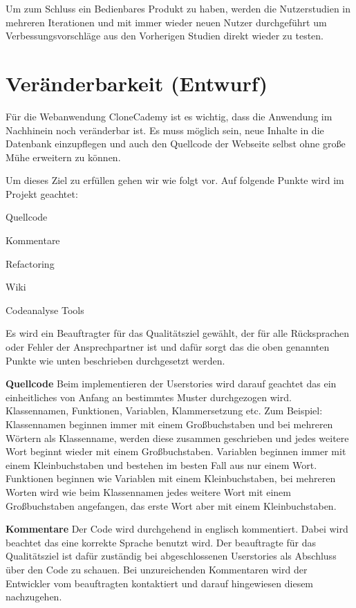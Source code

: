 \documentclass[accentcolor=tud0b,12pt,paper=a4]{tudreport}
\begin{document}
Um zum Schluss ein Bedienbares Produkt zu haben, werden die Nutzerstudien in mehreren Iterationen und mit immer wieder neuen Nutzer durchgeführt um Verbessungsvorschläge aus den Vorherigen Studien direkt wieder zu testen.

\section{Veränderbarkeit (Entwurf)}
Für die Webanwendung CloneCademy ist es wichtig, dass die Anwendung im Nachhinein noch veränderbar ist. Es muss möglich sein, neue Inhalte in die Datenbank einzupflegen und auch den Quellcode der Webseite selbst ohne große Mühe erweitern zu können.

Um dieses Ziel zu erfüllen gehen wir wie folgt vor. Auf folgende Punkte wird im Projekt geachtet:
\begin{description}
\item Quellcode
\item Kommentare
\item Refactoring
\item Wiki
\item Codeanalyse Tools
\end{description}

Es wird ein Beauftragter für das Qualitätsziel gewählt, der für alle Rücksprachen oder Fehler der Ansprechpartner ist und dafür sorgt das die oben genannten Punkte wie unten beschrieben durchgesetzt werden.

\textbf{Quellcode}
Beim implementieren der Userstories wird darauf geachtet das ein einheitliches von Anfang an bestimmtes Muster durchgezogen wird. Klassennamen, Funktionen, Variablen, Klammersetzung etc. Zum Beispiel:
Klassennamen beginnen immer mit einem Großbuchstaben und bei mehreren Wörtern als Klassenname, werden diese zusammen geschrieben und jedes weitere Wort beginnt wieder mit einem Großbuchstaben.
Variablen beginnen immer mit einem Kleinbuchstaben und bestehen im besten Fall aus nur einem Wort.
Funktionen beginnen wie Variablen mit einem Kleinbuchstaben, bei mehreren Worten wird wie beim Klassennamen jedes weitere Wort mit einem Großbuchstaben angefangen, das erste Wort aber mit einem Kleinbuchstaben.

\textbf{Kommentare}
Der Code wird durchgehend in englisch kommentiert. Dabei wird beachtet das eine korrekte Sprache benutzt wird. Der beauftragte für das Qualitätsziel ist dafür zuständig bei abgeschlossenen Userstories als Abschluss über den Code zu schauen. Bei unzureichenden Kommentaren wird der Entwickler vom beauftragten kontaktiert und darauf hingewiesen diesem nachzugehen.
\end{document}
